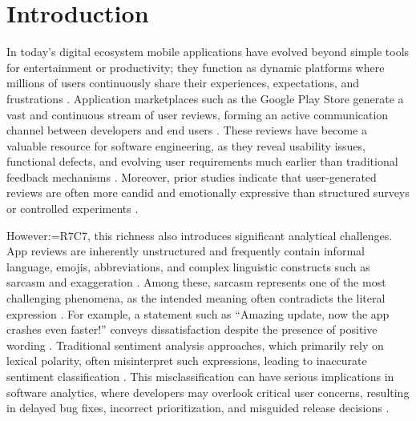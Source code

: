\documentclass[a4paper,fleqn]{cas-sc}
\makeatletter
\newif\iftracked
\newcommand{\rv@recordone}[1]{%
  \edef\rv@i{#1}%
  \ifcsdef{rv@n@\rv@i}{}{\csgdef{rv@n@\rv@i}{0}}%
  \csxdef{rv@n@\rv@i}{\the\numexpr\csuse{rv@n@\rv@i}+1\relax}%
  \begingroup\edef\@currentlabel{\rv@i}\label{rv:\rv@i:\csuse{rv@n@\rv@i}}\endgroup}
\newcommand{\rv@record}[1]{\@for\rv@id:=#1\do{\expandafter\rv@recordone\expandafter{\rv@id}}}
\DeclareRobustCommand{\rce}[1]{\rv@record{R7C7}\iftracked{\color{rvEdit}#1}\else#1\fi}
\makeatother
\begin{document}
\section{Introduction}
\label{sec:intro}

In today's digital ecosystem mobile applications have evolved beyond simple tools for entertainment or productivity; they function as dynamic platforms where millions of users continuously share their experiences, expectations, and frustrations \citep{maalej2015bug,putri2025sarcasm,alam2025automating}. Application marketplaces such as the Google Play Store generate a vast and continuous stream of user reviews, forming an active communication channel between developers and end users \citep{ciurumelea2017analyzing,khan2025exploring}. These reviews have become a valuable resource for software engineering, as they reveal usability issues, functional defects, and evolving user requirements much earlier than traditional feedback mechanisms \citep{delima2024opinion,gambo2024extracting}. Moreover, prior studies indicate that user-generated reviews are often more candid and emotionally expressive than structured surveys or controlled experiments \citep{nguyenduc2025generative}.

However\rce{,} this richness also introduces significant analytical challenges. App reviews are inherently unstructured and frequently contain informal language, emojis, abbreviations, and complex linguistic constructs such as sarcasm and exaggeration \citep{haripriya2017survey,wang2024how}. Among these, sarcasm represents one of the most challenging phenomena, as the intended meaning often contradicts the literal expression \citep{veeramani2024harnessing}. For example, a statement such as ``Amazing update, now the app crashes even faster!'' conveys dissatisfaction despite the presence of positive wording \citep{gonzalez2011identifying,celik2025analyzing}. Traditional sentiment analysis approaches, which primarily rely on lexical polarity, often misinterpret such expressions, leading to inaccurate sentiment classification \citep{poria2016deeper}. This misclassification can have serious implications in software analytics, where developers may overlook critical user concerns, resulting in delayed bug fixes, incorrect prioritization, and misguided release decisions \citep{adedigba2025systematic}.
\end{document}

